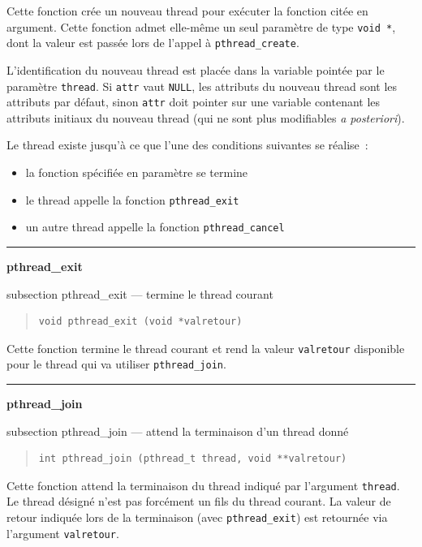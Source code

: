 \documentclass [twoside] {report}
\newcommand {\primitive} [1]
    {
	\phantomsection
	{\large \textbf {#1}}
	\addcontentsline {toc} {subsection} {#1}
    }
\newcommand {\separation}
    {
	\vspace {5mm}
	\nopagebreak
	\hrule
    }
\begin{document}
Cette fonction crée un nouveau thread pour exécuter la fonction
citée en argument. Cette fonction admet elle-même un seul paramètre
de type \verb|void *|, dont la valeur est passée lors de l'appel à
\verb|pthread_create|.

L'identification du nouveau thread est placée dans la variable pointée
par le paramètre \texttt {thread}. Si \texttt {attr} vaut \texttt {NULL},
les attributs du nouveau thread sont les attributs par défaut, sinon
\texttt {attr} doit pointer sur une variable contenant les attributs
initiaux du nouveau thread (qui ne sont plus modifiables \textit {a
posteriori}).

Le thread existe jusqu'à ce que l'une des conditions suivantes se
réalise~:

\begin {itemize}
    \item la fonction spécifiée en paramètre se termine
    \item le thread appelle la fonction \texttt {pthread\_exit}
    \item un autre thread appelle la fonction \texttt {pthread\_cancel}
\end {itemize}


\separation 
\primitive {pthread\_exit} --- termine le thread courant

\begin {quote}
\begin {verbatim}
void pthread_exit (void *valretour)
\end{verbatim}
\end {quote}

Cette fonction termine le thread courant et rend la valeur \texttt
{valretour} disponible pour le thread qui va utiliser \verb|pthread_join|.


\separation 
\primitive {pthread\_join} --- attend la terminaison d'un thread donné

\begin {quote}
\begin {verbatim}
int pthread_join (pthread_t thread, void **valretour)
\end{verbatim}
\end {quote}

Cette fonction attend la terminaison du thread indiqué par l'argument
\texttt {thread}. Le thread désigné n'est pas forcément un fils du
thread courant. La valeur de retour indiquée lors de la terminaison (avec
\verb|pthread_exit|) est retournée via l'argument \texttt {valretour}.
\end{document}
